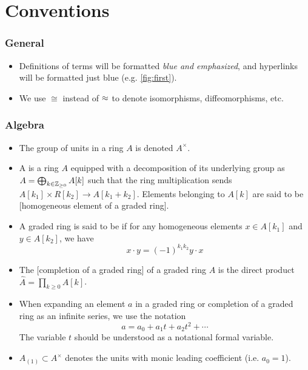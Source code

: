 \chapter*{Conventions}

\subsection*{General}

\begin{itemize}
  \item Definitions of terms will be formatted {\color{blue}\emph{blue and emphasized}}, and hyperlinks will be formatted just blue (e.g. \cref{fig:first}).
  \item We use $\cong$ instead of $\oldcong$ to denote isomorphisms, diffeomorphisms, etc.
\end{itemize}

\subsection*{Algebra}

\begin{itemize}
  \item The group of units in a ring $A$ is denoted $A^\times$.
  \item A  is a ring $A$ equipped with a decomposition of its underlying group as $A=\bigoplus_{k\in \mathbb{Z}_{\geq 0}} A[k]$ such that the ring multiplication sends $A[k_1]\times R[k_2] \to A[k_1+k_2]$. Elements belonging to $A[k]$ are said to be [homogeneous element of a graded ring]. 
  \item A graded ring is said to be  if for any homogeneous elements $x\in A[k_1]$ and $y\in A[k_2]$, we have
    \[
      x\cdot y = (-1)^{k_1k_2} y\cdot x
    \]
  \item The [completion of a graded ring] of a graded ring $A$ is the direct product $\widehat{A} = \prod_{k\geq 0} A[k]$.
  \item When expanding an element $a$ in a graded ring or completion of a graded ring as an infinite series, we use the notation
  \[
      a = a_0 + a_1t+a_2t^2+\cdots
  \]
  The variable $t$ should be understood as a notational formal variable.
  \item $A_{(1)}\subset A^\times$ denotes the units with monic leading coefficient (i.e. $a_0=1$).
\end{itemize}

